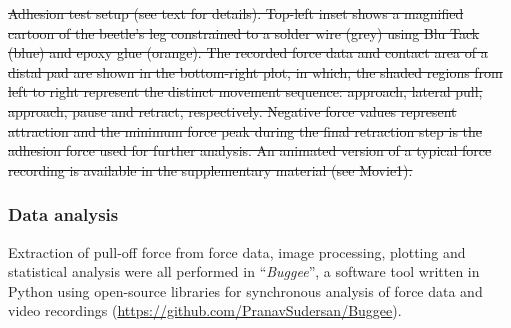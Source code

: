 \documentclass[vruler,JEB]{COB}%
\providecommand{\DIFdel}[1]{{\protect\color{red}\sout{#1}}}                      %
\providecommand{\DIFdelbegin}{} %
\providecommand{\DIFdelend}{} %
\providecommand{\DIFdelFL}[1]{\DIFdel{#1}} %
\begin{document}
\DIFdelbegin %
{%
\DIFdelFL{Adhesion test setup (see text for details). Top-left inset shows a magnified cartoon of the beetle's leg constrained to a solder wire (grey) using Blu Tack (blue) and epoxy glue (orange). The recorded force data and
contact area of a distal pad are shown in the bottom-right plot, in which, the shaded
regions from left to right represent the distinct movement sequence: approach, lateral pull, approach, pause and retract, respectively. Negative force values
represent attraction and the minimum force peak during the final retraction
step is the adhesion force used for further analysis. An animated version of a typical force recording is available in the supplementary material (see Movie1).}}

\DIFdelend %

\subsubsection{Data analysis}

Extraction of pull-off force from force data, image processing, plotting
and statistical analysis were all performed in ``\emph{Buggee}'',
a software tool written in Python using open-source libraries for synchronous
analysis of force data and video recordings (\url{https://github.com/PranavSudersan/Buggee}). 
\end{document}
